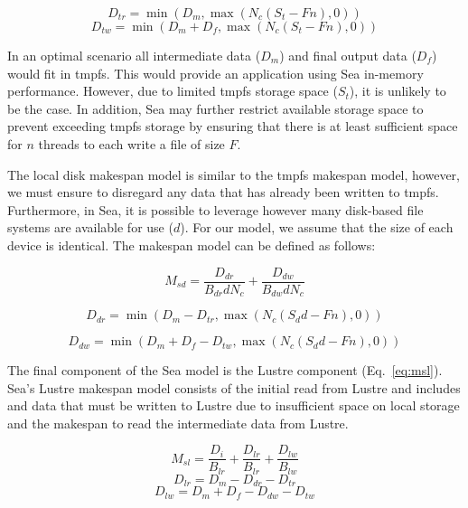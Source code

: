 \documentclass{report}
\begin{document}
    \begin{equation}\label{eq:dtr}
        D_{tr} = \min\left(D_{m}, \max{\left(N_{c}(S_{t} - Fn), 0 \right)} \right)
    \end{equation}
    \begin{equation}\label{eq:dtw}
        D_{tw} = \min\left(D_{m} + D_{f}, \max{\left(N_{c}(S_{t} - Fn), 0 \right)} \right)
    \end{equation}

    In an optimal scenario all intermediate data ($D_{m}$) and final output
    data ($D_{f}$) would fit in tmpfs. This would provide an application using
    Sea in-memory performance. However, due to limited tmpfs storage space ($S_{t}$), it is unlikely to be the case. In addition, Sea may further restrict
    available storage space to prevent exceeding tmpfs storage by ensuring that
    there is at least sufficient space for $n$ threads to each write a file of 
    size $F$.

    The local disk  makespan model is similar to the tmpfs makespan model, however, we
    must ensure to disregard any data that has already been written to tmpfs.
    Furthermore, in Sea, it is possible to leverage however many disk-based
    file systems are available for use ($d$). For our model, we assume that the
    size of each device is identical. 
    The makespan model can be defined as follows:

    \begin{equation}\label{eq:msd}
        M_{sd} =  \frac{D_{dr}}{B_{dr}dN_{c}} + \frac{D_{dw}}{B_{dw}dN_{c}}
    \end{equation}

    \begin{equation}\label{eq:ddr}
        D_{dr} = \min{(D_{m} - D_{tr}, \max{(N_{c}(S_{d}d - Fn),0)})}
    \end{equation}

    \begin{equation}\label{eq:ddw}
        D_{dw} = \min{(D_{m} + D_{f} - D_{tw}, \max{(N_{c}(S_{d}d - Fn),0)})}
    \end{equation}


    The final component of the Sea model is the Lustre component (Eq.~\ref{eq:msl}). Sea's Lustre
    makespan model consists of the initial read from Lustre and includes and
    data that must be written to Lustre due to insufficient space on local
    storage and the makespan to read the intermediate data from Lustre.

    \begin{equation}\label{eq:msl}
        M_{sl} = \frac{D_{i}}{B_{lr}} + \frac{D_{lr}}{B_{lr}} + \frac{D_{lw}}{B_{lw}}
    \end{equation}
    \begin{equation}\label{eq:dlr}
        D_{lr} = D_{m} - D_{dr} - D_{tr}
    \end{equation}
    \begin{equation}\label{eq:dlw}
        D_{lw} = D_{m} + D_{f} - D_{dw} - D_{tw}
    \end{equation}
\end{document}
